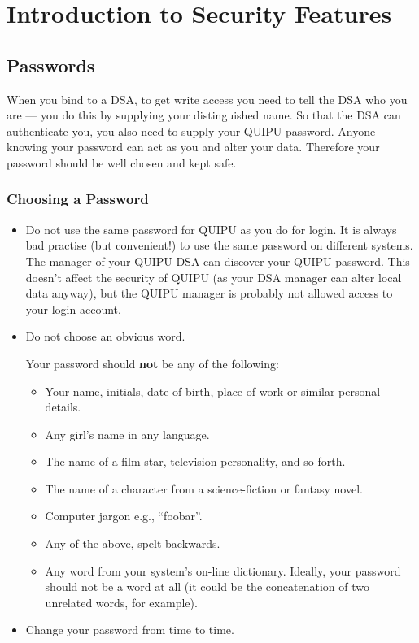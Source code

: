 
\chapter{Introduction to Security Features}
\label{Security}

\section{Passwords}
\label{Passwords}

When you bind to a DSA, to get write access you need to tell the DSA who you
are --- you do this by supplying your distinguished name.
So that the DSA can authenticate you, you also need to supply your QUIPU
password.
Anyone knowing your
password can act as you and alter your data. Therefore your password
should be well chosen
and kept safe.

\subsection{Choosing a Password}

\begin{itemize}
\item
Do not use the same password for QUIPU as you do for login.
It is always bad practise (but convenient!) to use the same password on
different systems. The manager of your QUIPU DSA can discover your QUIPU
password. This doesn't affect the security of QUIPU (as your DSA manager
can alter local data anyway), 
but the QUIPU manager is probably not allowed access to
your login account.
\item
Do not choose an obvious word.

Your password should {\bf not} be any of the following:
\begin{itemize}
\item
Your name, initials, date of birth, place of work or similar
personal details.
\item
Any girl's name in any language.
\item
The name of a film star, television personality, and so forth.
\item
The name of a character from a science-fiction or fantasy novel.
\item
Computer jargon e.g., ``foobar''.
\item
Any of the above, spelt backwards.
\item
Any word from your system's on-line dictionary. Ideally, your password
should not be a word at all (it could be the concatenation of two unrelated
words, for example).
\end{itemize}
\item
Change your password from time to time.
\end{itemize}

